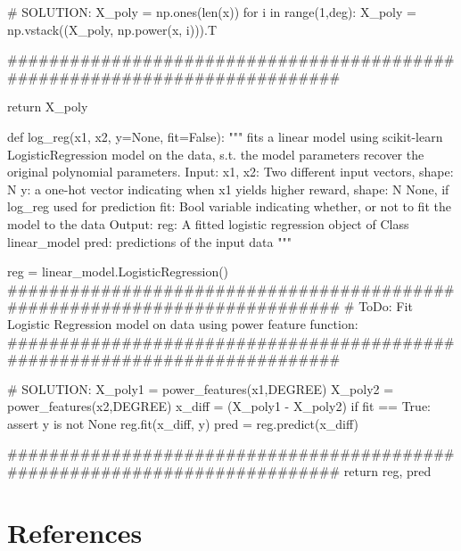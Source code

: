 \documentclass[
  letterpaper,
  DIV=11,
  numbers=noendperiod,
  oneside]{scrreprt}
\theoremstyle{remark}
\begin{document}
\# SOLUTION: X\_poly = np.ones(len(x)) for i in range(1,deg): X\_poly =
np.vstack((X\_poly, np.power(x, i))).T

\#\#\#\#\#\#\#\#\#\#\#\#\#\#\#\#\#\#\#\#\#\#\#\#\#\#\#\#\#\#\#\#\#\#\#\#\#\#\#\#\#\#\#\#\#\#\#\#\#\#\#\#\#\#\#\#\#\#\#\#\#\#\#\#\#\#\#\#\#\#\#\#\#\#\#

return X\_poly

def log\_reg(x1, x2, y=None, fit=False): """ fits a linear model using
scikit-learn LogisticRegression model on the data, s.t. the model
parameters recover the original polynomial parameters. Input: x1, x2:
Two different input vectors, shape: N y: a one-hot vector indicating
when x1 yields higher reward, shape: N None, if log\_reg used for
prediction fit: Bool variable indicating whether, or not to fit the
model to the data Output: reg: A fitted logistic regression object of
Class linear\_model pred: predictions of the input data """

reg = linear\_model.LogisticRegression()
\#\#\#\#\#\#\#\#\#\#\#\#\#\#\#\#\#\#\#\#\#\#\#\#\#\#\#\#\#\#\#\#\#\#\#\#\#\#\#\#\#\#\#\#\#\#\#\#\#\#\#\#\#\#\#\#\#\#\#\#\#\#\#\#\#\#\#\#\#\#\#\#\#\#\#
\# ToDo: Fit Logistic Regression model on data using power feature
function:
\#\#\#\#\#\#\#\#\#\#\#\#\#\#\#\#\#\#\#\#\#\#\#\#\#\#\#\#\#\#\#\#\#\#\#\#\#\#\#\#\#\#\#\#\#\#\#\#\#\#\#\#\#\#\#\#\#\#\#\#\#\#\#\#\#\#\#\#\#\#\#\#\#\#\#

\# SOLUTION: X\_poly1 = power\_features(x1,DEGREE) X\_poly2 =
power\_features(x2,DEGREE) x\_diff = (X\_poly1 - X\_poly2) if fit ==
True: assert y is not None reg.fit(x\_diff, y) pred =
reg.predict(x\_diff)

\#\#\#\#\#\#\#\#\#\#\#\#\#\#\#\#\#\#\#\#\#\#\#\#\#\#\#\#\#\#\#\#\#\#\#\#\#\#\#\#\#\#\#\#\#\#\#\#\#\#\#\#\#\#\#\#\#\#\#\#\#\#\#\#\#\#\#\#\#\#\#\#\#\#\#
return reg, pred

\section*{References}\label{bibliography-2}

\end{document}
